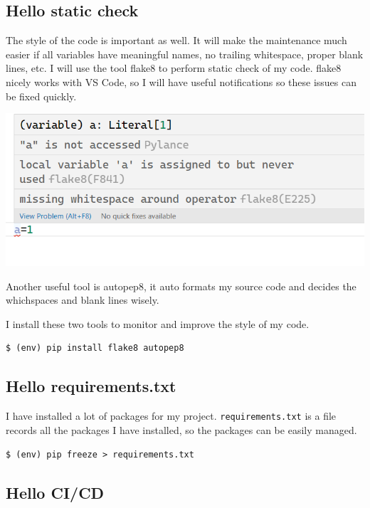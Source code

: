 \documentclass[a4paper]{report}
\begin{document}
\subsection{Hello static check}

The style of the code is important as well. It will make the maintenance much easier if all variables have meaningful names, no trailing whitespace, proper blank lines, etc. I will use the tool flake8 to perform static check of my code. flake8 nicely works with VS Code, so I will have useful notifications so these issues can be fixed quickly.

\includegraphics[width=\linewidth]{flake8.png}

Another useful tool is autopep8, it auto formats my source code and decides the whichspaces and blank lines wisely. 

I install these two tools to monitor and improve the style of my code.

\begin{verbatim}
$ (env) pip install flake8 autopep8
\end{verbatim}

\subsection{Hello requirements.txt}

I have installed a lot of packages for my project. \texttt{requirements.txt} is a file records all the packages I have installed, so the packages can be easily managed.

\begin{verbatim}
$ (env) pip freeze > requirements.txt
\end{verbatim}

\subsection{Hello CI/CD}
\end{document}
